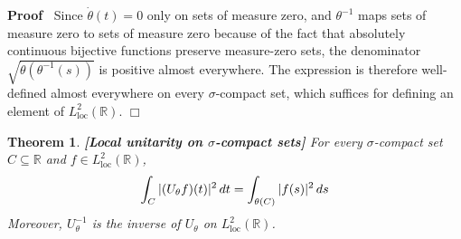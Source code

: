 \documentclass{article}
\newcommand{\tmop}[1]{\ensuremath{\operatorname{#1}}}
\newcommand{\tmstrong}[1]{\textbf{#1}}
\newenvironment{proof}{\noindent\textbf{Proof\ }}{\hspace*{\fill}$\Box$\medskip}
\newtheorem{theorem}{Theorem}
\begin{document}
\begin{proof}
  Since $\dot{\theta} (t) = 0$ only on sets of measure zero, and $\theta^{-
  1}$ maps sets of measure zero to sets of measure zero because of the fact
  that absolutely continuous bijective functions preserve measure-zero sets,
  the denominator $\sqrt{\dot{\theta} (\theta^{- 1} (s))}$ is positive almost
  everywhere. The expression is therefore well-defined almost everywhere on
  every $\sigma$-compact set, which suffices for defining an element of
  $L^2_{\tmop{loc}} (\mathbb{R})$.
\end{proof}

\begin{theorem}
  {\tmstrong{[Local unitarity on $\sigma$-compact
  sets]\label{thm:local_unitarity}}} For every $\sigma$-compact set $C
  \subseteq \mathbb{R}$ and $f \in L^2_{\tmop{loc}} (\mathbb{R})$,
  \begin{equation}
    \int_C | (U_{\theta} f) (t) |^2 \hspace{0.17em} dt = \int_{\theta (C)} |f
    (s) |^2  \hspace{0.17em} ds
  \end{equation}
  Moreover, $U_{\theta}^{- 1}$ is the inverse of $U_{\theta}$ on
  $L^2_{\tmop{loc}} (\mathbb{R})$.
\end{theorem}
\end{document}
